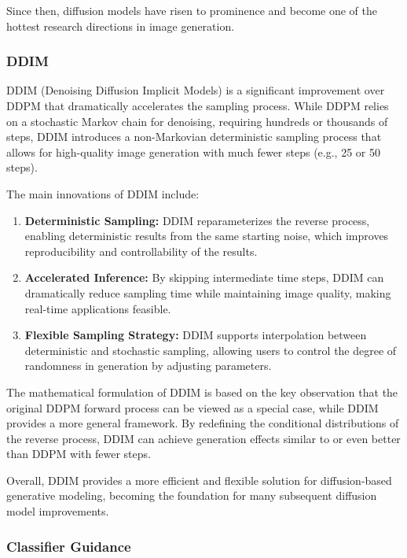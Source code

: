\documentclass{article}
\begin{document}
Since then, diffusion models have risen to prominence and become one of the hottest research directions in 
image generation.

\subsubsection{DDIM}

DDIM (Denoising Diffusion Implicit Models) is a significant improvement over DDPM that dramatically accelerates
the sampling process. While DDPM relies on a stochastic Markov chain for denoising, requiring hundreds or thousands 
of steps, DDIM introduces a non-Markovian deterministic sampling process that allows for high-quality image 
generation with much fewer steps (e.g., 25 or 50 steps).

The main innovations of DDIM include:

\begin{enumerate}
    \item \textbf{Deterministic Sampling:} DDIM reparameterizes the reverse process, enabling deterministic 
    results from the same starting noise, which improves reproducibility and controllability of the results.
    \item \textbf{Accelerated Inference:} By skipping intermediate time steps, DDIM can dramatically reduce 
    sampling time while maintaining image quality, making real-time applications feasible.
    \item \textbf{Flexible Sampling Strategy:} DDIM supports interpolation between deterministic and 
    stochastic sampling, allowing users to control the degree of randomness in generation by adjusting parameters.
\end{enumerate}

The mathematical formulation of DDIM is based on the key observation that the original DDPM forward process can 
be viewed as a special case, while DDIM provides a more general framework. By redefining the conditional distributions 
of the reverse process, DDIM can achieve generation effects similar to or even better than DDPM with fewer steps.

Overall, DDIM provides a more efficient and flexible solution for diffusion-based generative modeling, becoming 
the foundation for many subsequent diffusion model improvements.

\subsubsection{Classifier Guidance}
\end{document}
